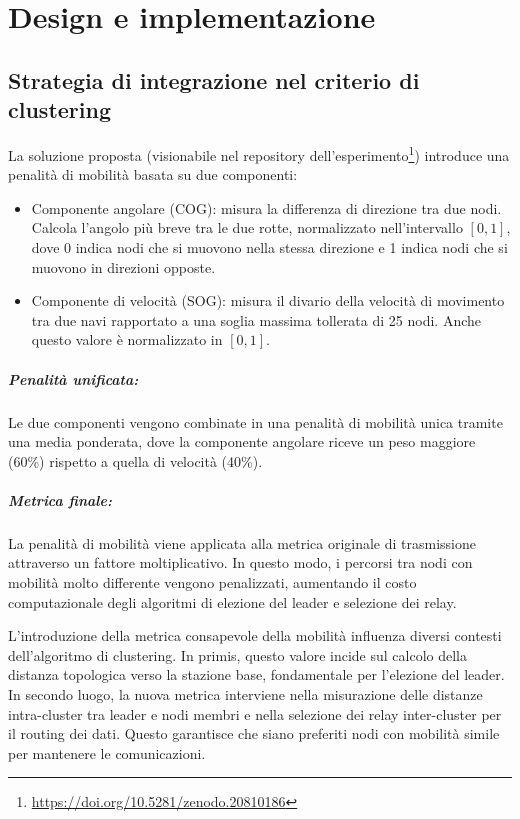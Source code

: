 \chapter{Design e implementazione}
\label{chap:designImplementazione}

\section{Strategia di integrazione nel criterio di clustering}
\label{sec:integrazione_criterio_clustering}

La soluzione proposta (visionabile nel repository dell'esperimento\footnote{\url{https://doi.org/10.5281/zenodo.20810186}}) introduce una penalità di mobilità basata su due componenti:
\begin{itemize}
	\item Componente angolare (\ac{COG}): misura la differenza di direzione tra due nodi. Calcola l'angolo più breve tra le due rotte, normalizzato nell'intervallo $[0, 1]$, dove 0 indica nodi che si muovono nella stessa direzione e 1 indica nodi che si muovono in direzioni opposte.
	\item Componente di velocità (\ac{SOG}): misura il divario della velocità di movimento tra due navi rapportato a una soglia massima tollerata di 25 nodi. Anche questo valore è normalizzato in $[0, 1]$.
\end{itemize}

\paragraph{Penalità unificata:}
Le due componenti vengono combinate in una penalità di mobilità unica tramite una media ponderata, dove la componente angolare riceve un peso maggiore (60\%) rispetto a quella di velocità (40\%).

\paragraph{Metrica finale:}
La penalità di mobilità viene applicata alla metrica originale di trasmissione attraverso un fattore moltiplicativo. In questo modo, i percorsi tra nodi con mobilità molto differente vengono penalizzati, aumentando il costo computazionale degli algoritmi di elezione del leader e selezione dei relay.

L'introduzione della metrica consapevole della mobilità influenza diversi contesti dell'algoritmo di clustering. In primis, questo valore incide sul calcolo della distanza topologica verso la stazione base, fondamentale per l'elezione del leader. In secondo luogo, la nuova metrica interviene nella misurazione delle distanze intra-cluster tra leader e nodi membri e nella selezione dei relay inter-cluster per il routing dei dati. Questo garantisce che siano preferiti nodi con mobilità simile per mantenere le comunicazioni.

